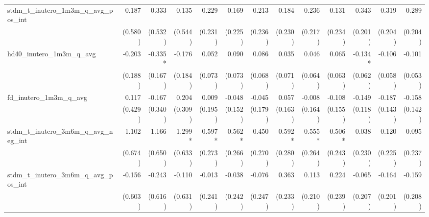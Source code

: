 \begin{tabular}{lrrrrrrrrrrrr}
stdm\_t\_inutero\_1m3m\_q\_avg\_pos\_int    &        0.187 &        0.333 &        0.135 &        0.229 &        0.169 &        0.213 &        0.184 &        0.236 &        0.131 &        0.343 &        0.319 &        0.289 \\ 
                                            &      (0.580) &      (0.532) &      (0.544) &      (0.231) &      (0.225) &      (0.236) &      (0.230) &      (0.217) &      (0.234) &      (0.201) &      (0.204) &      (0.204) \\ 
hd40\_inutero\_1m3m\_q\_avg                 &       -0.203 &      -0.335* &       -0.176 &        0.052 &        0.090 &        0.086 &        0.035 &        0.046 &        0.065 &      -0.134* &       -0.106 &       -0.101 \\ 
                                            &      (0.188) &      (0.167) &      (0.184) &      (0.073) &      (0.073) &      (0.068) &      (0.071) &      (0.064) &      (0.063) &      (0.062) &      (0.058) &      (0.053) \\ 
fd\_inutero\_1m3m\_q\_avg                   &        0.117 &       -0.167 &        0.204 &        0.009 &       -0.048 &       -0.045 &        0.057 &       -0.008 &       -0.108 &       -0.149 &       -0.187 &       -0.158 \\ 
                                            &      (0.429) &      (0.340) &      (0.309) &      (0.195) &      (0.152) &      (0.179) &      (0.163) &      (0.164) &      (0.155) &      (0.118) &      (0.143) &      (0.142) \\ 
stdm\_t\_inutero\_3m6m\_q\_avg\_neg\_int    &       -1.102 &       -1.166 &      -1.299* &      -0.597* &      -0.562* &       -0.450 &      -0.592* &      -0.555* &      -0.506* &        0.038 &        0.120 &        0.095 \\ 
                                            &      (0.674) &      (0.650) &      (0.633) &      (0.273) &      (0.266) &      (0.270) &      (0.280) &      (0.264) &      (0.243) &      (0.230) &      (0.225) &      (0.237) \\ 
stdm\_t\_inutero\_3m6m\_q\_avg\_pos\_int    &       -0.156 &       -0.243 &       -0.110 &       -0.013 &       -0.038 &       -0.076 &        0.363 &        0.113 &        0.224 &       -0.065 &       -0.164 &       -0.159 \\ 
                                            &      (0.603) &      (0.616) &      (0.631) &      (0.241) &      (0.242) &      (0.247) &      (0.233) &      (0.210) &      (0.239) &      (0.207) &      (0.201) &      (0.208) \\ 

\end{tabular}
